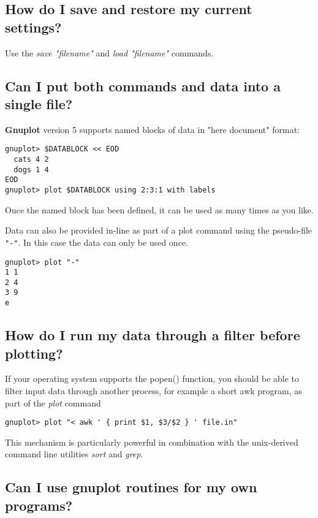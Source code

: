 \documentclass[a4paper,11pt]{article}
\newcommand{\gnuplot}{\textbf{gnuplot }}
\newcommand{\Gnuplot}{\textbf{Gnuplot }}
\begin{document}
\subsection{How do I save and restore my current settings?}

Use the {\em save "filename"} and {\em load "filename"} commands.

\subsection{Can I put both commands and data into a single file?}

\Gnuplot version 5 supports named blocks of data in "here document" format:
\small
\begin{verbatim}
gnuplot> $DATABLOCK << EOD
  cats 4 2
  dogs 1 4
EOD
gnuplot> plot $DATABLOCK using 2:3:1 with labels
\end{verbatim}
\normalsize
Once the named block has been defined, it can be used as many times
as you like.

Data can also be provided in-line as part of a plot command using the
pseudo-file \verb+"-"+.  In this case the data can only be used once.

\small
\begin{verbatim}
gnuplot> plot "-"
1 1
2 4
3 9
e
\end{verbatim}
\normalsize

\subsection{How do I run my data through a filter before plotting?}

If your operating system supports the popen() function, you 
should be able to filter input data through another process, for
example a short awk program, as part of the {\em plot} command

\small
\begin{verbatim}
gnuplot> plot "< awk ' { print $1, $3/$2 } ' file.in"
\end{verbatim}
\normalsize

This mechanism is particularly powerful in combination with the
unix-derived command line utilities {\em sort} and {\em grep}.

\subsection{Can I use \gnuplot routines for my own programs?}
\end{document}
